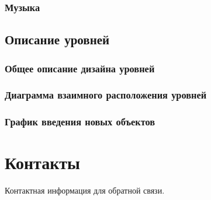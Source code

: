 \documentclass{article}
\begin{document}
\subsubsection{Музыка}


\subsection{Описание уровней}
\subsubsection{Общее описание дизайна уровней}


\subsubsection{Диаграмма взаимного расположения уровней}


\subsubsection{График введения новых объектов}


\newpage

\section{Контакты}
Контактная информация для обратной связи.
\end{document}
